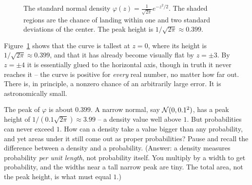 \begin{figure}[H]
\centering
{}
\caption{The standard normal density $\varphi(z) = \frac{1}{\sqrt{2\pi}}e^{-z^2/2}$.
The shaded regions are the chance of landing within one and two standard
deviations of the center. The peak height is $1/\sqrt{2\pi}\approx 0.399$.}
\label{ch12:fig-standard}
\end{figure}

Figure~\ref{ch12:fig-standard} shows that the curve is tallest at $z=0$,
where its height is $1/\sqrt{2\pi}\approx 0.399$, and that it has already become
visually flat by $z = \pm 3$. By $z = \pm 4$ it is essentially glued to the
horizontal axis, though in truth it never reaches it -- the curve is positive for
\emph{every} real number, no matter how far out. There is, in principle, a
nonzero chance of an arbitrarily large error. It is astronomically small.

\begin{walkbox}
The peak of $\varphi$ is about $0.399$. A narrow normal, say $\mathcal{N}(0, 0.1^2)$,
has a peak height of $1/(0.1\sqrt{2\pi})\approx 3.99$ -- a density value well above
$1$. But probabilities can never exceed $1$. How can a density take a value bigger
than any probability, and yet areas under it still come out as proper
probabilities? Pause and recall the difference between a density and a
probability. (Answer: a density measures probability \emph{per
unit length}, not probability itself. You multiply by a width to get probability, and the widths near a
tall narrow peak are tiny. The total area, not the peak height, is what must
equal $1$.)
\end{walkbox}

